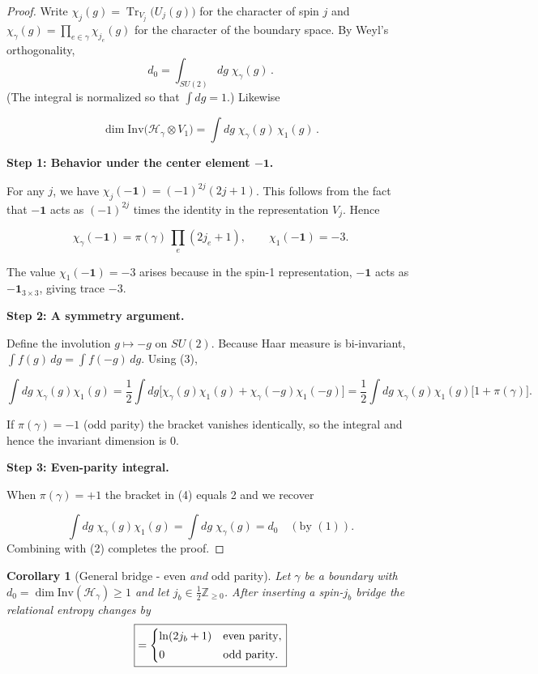 \documentclass[11pt, a4paper]{article}
\theoremstyle{plain}
\newtheorem{corollary}[theorem]{Corollary}
\theoremstyle{definition}
\theoremstyle{remark}
\newcommand{\Hil}{\mathcal{H}}
\newcommand{\Inv}{\mathrm{Inv}}
\begin{document}
\begin{proof}
Write $\chi_j(g)=\operatorname{Tr}_{V_j}\!\bigl(U_j(g)\bigr)$ for the
character of spin $j$ and
\(
  \chi_{\gamma}(g)=\prod_{e\in\gamma}\chi_{j_e}(g)
\)
for the character of the boundary space.
By Weyl's orthogonality,
\[  d_0  =\int_{SU(2)}\!dg\;    \chi_{\gamma}(g)\, .\tag{1}\]
(The integral is normalized so that $\!\int dg=1$.)  Likewise

\[  \dim\Inv\!\bigl(\Hil_{\gamma}\otimes V_1\bigr)  =\int dg\;\chi_{\gamma}(g)\,\chi_1(g)\, .\tag{2}\]

\textbf{Step 1: Behavior under the center element $-\mathbf{1}$.}

For any $j$, we have $\chi_j(-\mathbf{1})=(-1)^{2j}(2j+1)$. This follows from the fact that $-\mathbf{1}$ acts as $(-1)^{2j}$ times the identity in the representation $V_j$. Hence  

\[  \chi_{\gamma}(-\mathbf{1})  =\pi(\gamma)\,    \prod_{e}(2j_e+1),\qquad  \chi_1(-\mathbf{1})=-3.\tag{3}\]

The value $\chi_1(-\mathbf{1})=-3$ arises because in the spin-1 representation, $-\mathbf{1}$ acts as $-\mathbf{1}_{3\times3}$, giving trace $-3$.

\textbf{Step 2: A symmetry argument.}

Define the involution $g\mapsto -g$ on \(SU(2)\).  
Because Haar measure is bi-invariant, \(\int f(g)\,dg=\int f(-g)\,dg\).
Using (3),

\[  \int dg\;\chi_{\gamma}(g)\chi_1(g)  =  \frac12  \int dg  \bigl[\chi_{\gamma}(g)\chi_1(g)+\chi_{\gamma}(-g)\chi_1(-g)\bigr]
  =
  \frac12\!\int dg\;
  \chi_{\gamma}(g)\chi_1(g)\bigl[1+\pi(\gamma)\bigr].
\tag{4}
\]

If \(\pi(\gamma)=-1\) (odd parity) the bracket vanishes identically, so
the integral and hence the invariant dimension is 0.

\textbf{Step 3: Even-parity integral.}

When \(\pi(\gamma)=+1\) the bracket in (4) equals 2 and we recover  

\[  \int dg\;\chi_{\gamma}(g)\chi_1(g)  =\int dg\;\chi_{\gamma}(g)  =d_0  \quad(\text{by }(1)).\]
Combining with (2) completes the proof.
\end{proof}

\begin{corollary}[General bridge - even \textit{and} odd parity]
\label{cor:general_bridge}
Let $\gamma$ be a boundary with $d_0=\dim\Inv(\Hil_{\gamma})\ge1$
and let $j_b\in\frac12\mathbb Z_{\ge0}$.
After inserting a spin-$j_b$ bridge the relational entropy changes by
\[  \boxed{%
  =\begin{cases}
      \ln(2j_b+1) & \text{even parity},\\[2pt]
      0           & \text{odd parity}.
    \end{cases}}
\]
\end{corollary}
\end{document}
